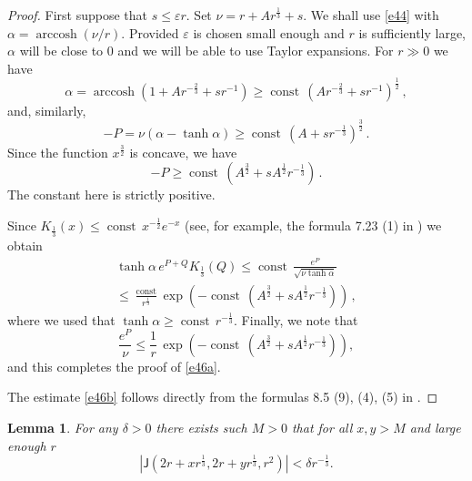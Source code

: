 \documentclass[12pt]{amsart}
\newcommand{\J}{\mathsf{J}}
\newcommand{\const}{\operatorname{const}}
\theoremstyle{plain}
\newtheorem{lemma}{Lemma}[section]
\theoremstyle{definition}
\numberwithin{equation}{section}
\begin{document}
\begin{proof} 
First suppose  that $s\le\varepsilon r$. Set $\nu=r+Ar^{\frac 13}+s$. We shall use 
\eqref{e44}  with $\alpha=\operatorname{arccosh}(\nu/r)$. Provided $\varepsilon$ 
is chosen 
small enough and $r$ is sufficiently large,   $\alpha$ will be close to $0$ and we
will be able to use Taylor expansions.
For $r\gg 0$ we have
%
\begin{equation*}
\alpha=\operatorname{arccosh}(1+Ar^{-\frac 23}+sr^{-1})\ge
\const\,(Ar^{-\frac 23}+sr^{-1})^{\frac 12} \,,
\end{equation*}
%
and, similarly,
%
\begin{equation*}
-P=\nu(\alpha-\tanh\alpha)\ge \const\,(A+sr^{-\frac 13})^{\frac 32}\,.
\end{equation*}
%
Since the function $x^{\frac 32}$ is concave, we have 
%
$$ 
-P\ge \const\,(A^{\frac 32}+sA^{\frac 12}r^{-\frac 13})\,.
$$
%
The constant here is strictly positive.

Since $K_{\frac 13}(x)\le \const\, x^{-\frac 12} e^{-x}$ (see, for example, the 
formula 
7.23 (1) in \cite{W})  we obtain
%
\begin{multline*}
\tanh\alpha \,e^{P+Q}K_{\frac 13}\left(Q\right)\le \const\, 
\frac{e^{P}}{\sqrt{\nu\tanh\alpha}}\\ \le \frac{\const}  {r^{\frac 
13}}
\exp\left(-\const\,\left(A^{\frac 32}+sA^{\frac 12}r^{-\frac 13}\right)\right)\,,
\end{multline*}
%
where we used that  $\tanh\alpha\ge \const\, r^{-\frac 13}$.  Finally, we note that
%
\begin{equation*}
\frac {e^P}{\nu}\le \frac1r\, \exp\left({-\const\,\left(A^{\frac 32}+sA^{\frac 
12}r^{-\frac 13}\right)}\right),
\end{equation*}
%
and this completes the proof of \eqref{e46a}.

The estimate \eqref{e46b} follows directly from the formulas 
8.5 (9), (4), (5) in \cite{W}. 
\end{proof}

\begin{lemma}\label{l47} For any $\delta>0$ there exists such $M>0$ that for all 
$x,y>M$ and large enough $r$
%
\begin{equation*}
\left|\J\left(2r+xr^{\frac 13},2r+yr^{\frac 13}, {r^2}\right)\right|<\delta 
r^{-\frac 13}.
\end{equation*}
%
\end{lemma}
\end{document}
